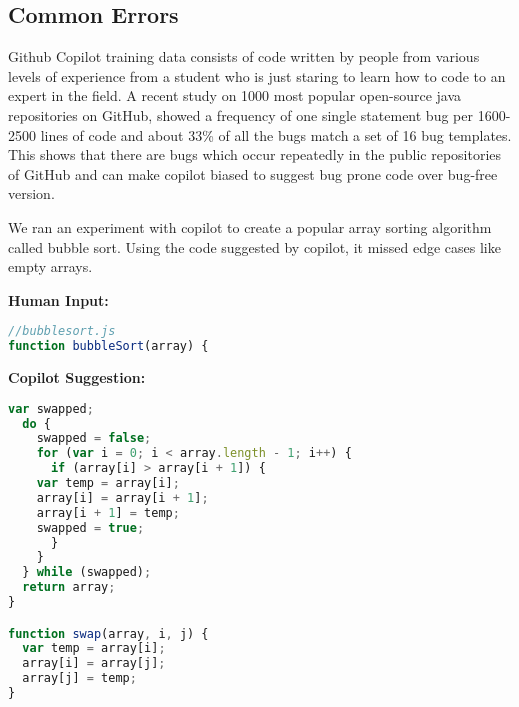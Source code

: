 \subsection{Common Errors}
\label{common}

Github Copilot\cite{copilot} training data consists of code written by people from various levels of experience from a student who is just staring to learn how to code to an expert in the field. A recent study \cite{github_bugs} on 1000 most popular open-source java repositories on GitHub, showed a frequency of one single statement bug per 1600-2500 lines of code and about 33\% of all the bugs match a set of 16 bug templates. This shows that there are bugs which occur repeatedly in the public repositories of GitHub and can make copilot biased to suggest bug prone code over bug-free version.

We ran an experiment with copilot to create a popular array sorting algorithm called bubble sort. Using the code suggested by copilot, it missed edge cases like empty arrays.

\begin{tcolorbox}[title=BubbleSort algorithm,boxsep=.5mm]
\textbf{Human Input:}
\begin{lstlisting}[language={JavaScript}]
//bubblesort.js
function bubbleSort(array) {
\end{lstlisting}
\tcbline
\textbf{Copilot Suggestion:}
\begin{lstlisting}[language=JavaScript,escapechar=\%]
	var swapped;
  do {
    swapped = false;
    for (var i = 0; i < array.length - 1; i++) {
      if (array[i] > array[i + 1]) {
	var temp = array[i];
	array[i] = array[i + 1];
	array[i + 1] = temp;
	swapped = true;
      }
    }
  } while (swapped);
  return array;
}

function swap(array, i, j) {
  var temp = array[i];
  array[i] = array[j];
  array[j] = temp;
}
\end{lstlisting}
\end{tcolorbox}